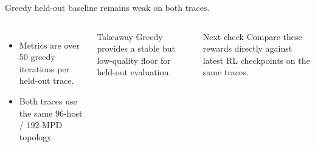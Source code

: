 \documentclass[11pt,aspectratio=43]{beamer}
\begin{document}
\begin{frame}{Greedy held-out baseline remains weak on both traces.}

  \begin{columns}[T,onlytextwidth]
      \small

      \vspace{0.6em}
      \begin{itemize}
        \setlength{\itemsep}{0.5em}
        \item Metrics are over 50 greedy iterations per held-out trace.
        \item Both traces use the same 96-host / 192-MPD topology.
      \end{itemize}

      \vspace{0.55em}
      \begin{block}{Takeaway}
        \small
        Greedy provides a stable but low-quality floor for held-out evaluation.
      \end{block}

      \vspace{0.45em}
      \begin{block}{Next check}
        \small
        Compare these rewards directly against latest RL checkpoints on the same traces.
      \end{block}
  \end{columns}

\end{frame}
\end{document}
